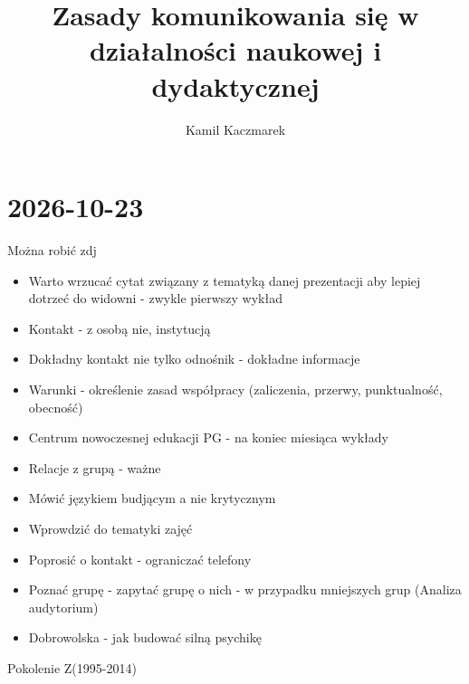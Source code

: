 \documentclass[]{article}
\title{Zasady komunikowania się w działalności naukowej i dydaktycznej}
\author{Kamil Kaczmarek}
\begin{document}
\maketitle


\section{2026-10-23}
\noindent Można robić zdj
\begin{itemize}
	\item Warto wrzucać cytat związany z tematyką danej prezentacji aby lepiej dotrzeć do widowni - zwykle pierwszy wykład
	\item Kontakt - z osobą nie, instytucją
	\item Dokładny kontakt nie tylko odnośnik - dokładne informacje 
	\item Warunki - określenie zasad współpracy (zaliczenia, przerwy, punktualność, obecność)
	\item Centrum nowoczesnej edukacji PG - na koniec miesiąca wykłady
	\item Relacje z grupą - ważne
	\item Mówić językiem budjącym a nie krytycznym
	\item Wprowdzić do tematyki zajęć
	\item Poprosić o kontakt - ograniczać telefony
	\item Poznać grupę - zapytać grupę o nich - w przypadku mniejszych grup (Analiza audytorium)
	\item Dobrowolska - jak budować silną psychikę

\end{itemize}
Pokolenie Z(1995-2014)
\end{document}
